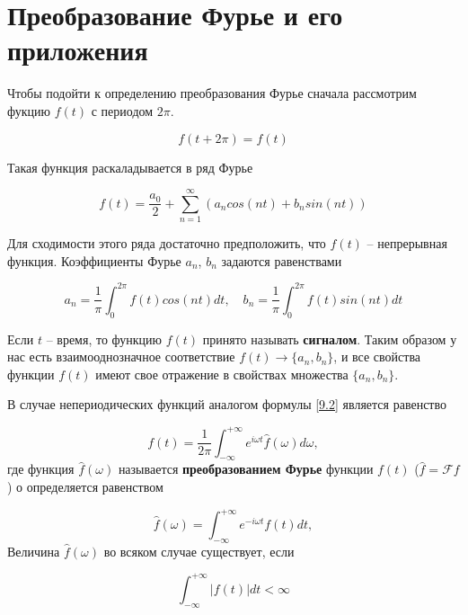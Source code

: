 \section{Преобразование Фурье и его приложения}
\label{lecture9}

Чтобы подойти к определению преобразования Фурье сначала рассмотрим фукцию $f(t)$ с периодом $2\pi$.

\begin{equation}\label{9.1}
	f(t+2\pi) = f(t)
\end{equation}

Такая функция раскаладывается в ряд Фурье 

\begin{equation}\label{9.2}
f(t) = \frac{a_0}{2} + \sum_{n = 1}^{\infty}(a_n cos(nt) + b_n sin(nt)) 
\end{equation}

Для сходимости этого ряда достаточно предположить, что $f(t)$ -- непрерывная функция.
Коэффициенты Фурье $a_n$, $b_n$ задаются равенствами

\begin{equation}\label{9.3}
a_n = \frac{1}{\pi} \int_{0}^{2\pi} f(t) cos(nt) dt,\quad b_n = \frac{1}{\pi} \int_{0}^{2\pi} f(t) sin(nt) dt
\end{equation} 

Если $t$ -- время, то функцию $f(t)$ принято называть \textbf{сигналом}. 
Таким образом у нас есть взаимооднозначное соответствие $f(t) \rightarrow \{a_n, b_n\}$, и все свойства функции $f(t)$ имеют свое отражение в свойствах множества $\{a_n, b_n\}$.

В случае непериодических функций аналогом формулы \ref{9.2} является равенство 

\begin{equation}\label{9.4}
f(t) = \frac{1}{2\pi}\int_{-\infty}^{+\infty} e^{i\omega t} \hat{f} (\omega) d\omega,
\end{equation}
где функция $\hat{f}(\omega)$ называется \textbf{преобразованием Фурье} функции $f(t)$ ($ \hat{f} = \mathscr{F} f$)
о определяется равенством 

\begin{equation}\label{9.5}
\hat{f} (\omega) = \int_{-\infty}^{+\infty} e^{-i\omega t} f(t) dt,
\end{equation}
Величина $\hat{f} (\omega)$ во всяком случае существует, если 

\begin{equation}\label{9.6}
\int_{-\infty}^{+\infty} |f(t)| dt < \infty
\end{equation}

